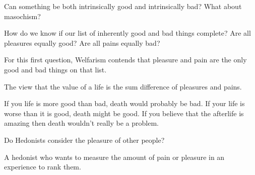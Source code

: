\begin{problem}
Can something be both intrinsically good and intrinsically bad? What about masochism?
\end{problem}

\begin{problem}
How do we know if our list of inherently good and bad things complete? Are all pleasures equally good? Are all pains equally bad?
\end{problem}

For this first question, Welfarism contends that pleasure and pain are the only good and bad things on that list.

\begin{definition}[Hedonism]
The view that the value of a life is the sum difference of pleasures and pains.
\end{definition}

\begin{example}
If you life is more good than bad, death would probably be bad. If your life is worse than it is good, death might be good. If you believe that the afterlife is amazing then death wouldn't really be a problem.
\end{example}

\begin{problem}
Do Hedonists consider the pleasure of other people?
\end{problem}

\begin{definition}
A hedonist who wants to measure the amount of pain or pleasure in an experience to rank them.
\end{definition}